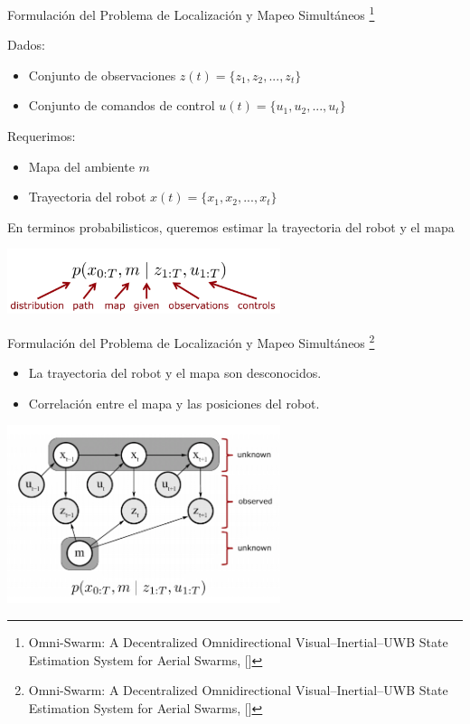 \documentclass[24pt,aspectratio=169]{beamer}
\begin{document}
\begin{frame}{Formulación del Problema de Localización y Mapeo Simultáneos \footnote{\tiny Omni-Swarm: A Decentralized Omnidirectional Visual–Inertial–UWB State Estimation System for Aerial Swarms, [\cite{OMNI2022}]}}

  \small{
    Dados:
    \begin{itemize}
    \item Conjunto de observaciones $z(t) = \{z_1,z_2,...,z_t\}$
    \item Conjunto de comandos de control $u(t) = \{u_1,u_2,...,u_t\}$
    \end{itemize}
    Requerimos:
    \begin{itemize}
    \item Mapa del ambiente $m$
    \item Trayectoria del robot $x(t) = \{x_1,x_2,...,x_t\}$
    \end{itemize}
    
    En terminos probabilisticos, queremos estimar la trayectoria del robot y el mapa
  }
  \centering
  \includegraphics[width=8cm]{slam1}
  \bigskip %
\end{frame}

\begin{frame}{Formulación del Problema de Localización y Mapeo Simultáneos \footnote{\tiny Omni-Swarm: A Decentralized Omnidirectional Visual–Inertial–UWB State Estimation System for Aerial Swarms, [\cite{OMNI2022}]}}
  
  \begin{itemize}
  \item La trayectoria del robot y el mapa son desconocidos.
  \item Correlación entre el mapa y las posiciones del robot.
  \end{itemize}
  
  \centering
  \includegraphics[width=8cm]{slam2}
  \bigskip %
\end{frame}
\end{document}

